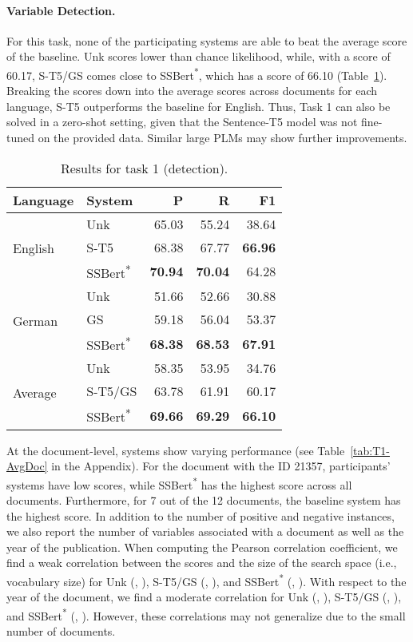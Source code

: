 \documentclass[11pt]{article}
\begin{document}
\paragraph{Variable Detection.} 
For this task, none of the participating systems are able to beat the average score of the baseline.
Unk scores lower than chance likelihood, while, with a score of 60.17, S-T5/GS comes close to SSBert\textsuperscript{*}, which has a score of 66.10 (Table~\ref{tab:T1-Avg}).
Breaking the scores down into the average scores across documents for each language, S-T5 outperforms the baseline for English.
Thus, Task 1 can also be solved in a zero-shot setting, given that the Sentence-T5 model was not fine-tuned on the provided data.
Similar large PLMs may show further improvements.

\begin{table}[]
    \centering
    \begin{tabular}{l|l|r|r|r}
    Language &  System &    P &     R &     F1\\ \hline
    \hline
      \multirow{3}{0.5em}{English} &    Unk &  65.03 &  55.24 &  38.64 \\&    S-T5 &  68.38 &  67.77 &  \textbf{66.96} \\&   SSBert\textsuperscript{*} &  \textbf{70.94} &  \textbf{70.04} &  64.28 \\\hline
      \multirow{3}{0.5em}{German} &    Unk &  51.66 &  52.66 &  30.88 \\&    GS &  59.18 &  56.04 &  53.37 \\&    SSBert\textsuperscript{*} &  \textbf{68.38} &  \textbf{68.53} &  \textbf{67.91} \\\hline
    \multirow{3}{0.5em}{Average} &    Unk &  58.35 &  53.95 &  34.76 \\&    S-T5/GS &  63.78 &  61.91 &  60.17 \\&    SSBert\textsuperscript{*} &  \textbf{69.66} &  \textbf{69.29} &  \textbf{66.10} \\\hline
    \end{tabular}
    \caption{Results for task 1 (detection).}
    \label{tab:T1-Avg}
\end{table}

At the document-level, systems show varying performance (see Table~\ref{tab:T1-AvgDoc} in the Appendix).
For the document with the ID 21357, participants' systems have low scores, while SSBert\textsuperscript{*} has the highest score across all documents.
Furthermore, for 7 out of the 12 documents, the baseline system has the highest score.
In addition to the number of positive and negative instances, we also report the number of variables associated with a document as well as the year of the publication.
When computing the Pearson correlation coefficient, we find a weak correlation between the  scores and the size of the search space (i.e., vocabulary size) for Unk (, ), S-T5/GS (, ), and SSBert\textsuperscript{*} (, ).
With respect to the year of the document, we find a moderate correlation for Unk (, ), S-T5/GS (, ), and SSBert\textsuperscript{*} (, ).
However, these correlations may not generalize due to the small number of documents.
\end{document}
